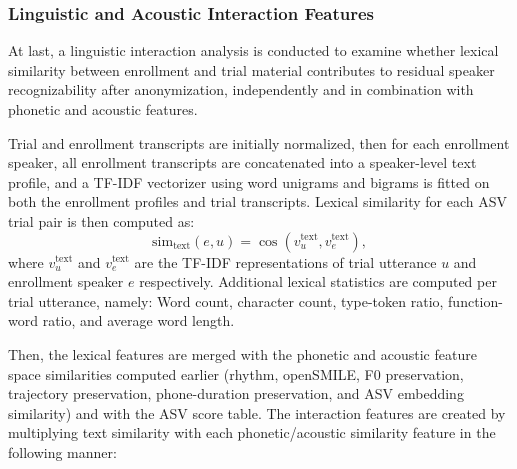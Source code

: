 \documentclass[12pt,leqno,a4paper]{article}
\begin{document}

\subsubsection{Linguistic and Acoustic Interaction Features}
\label{subsec:linguistic_acoustic_interaction}

At last, a linguistic interaction analysis is conducted to examine whether lexical similarity between enrollment and trial material 
contributes to residual speaker recognizability after anonymization, independently and in combination with phonetic and acoustic features.

Trial and enrollment transcripts are initially normalized, then for each enrollment speaker, all enrollment transcripts are concatenated into a speaker-level text profile, and a TF-IDF vectorizer using word unigrams and bigrams is fitted on both the enrollment profiles and trial transcripts. 
Lexical similarity for each ASV trial pair is then computed as:
\begin{equation}
\mathrm{sim}_{\mathrm{text}}(e,u) =
\cos(v_u^{\mathrm{text}}, v_e^{\mathrm{text}}),
\end{equation}
where $v_u^{\mathrm{text}}$ and $v_e^{\mathrm{text}}$ are the TF-IDF representations of trial utterance $u$ and enrollment speaker $e$ respectively. Additional lexical statistics are computed per trial utterance, namely: Word count, character count, type-token ratio, function-word ratio, and average word length.

Then, the lexical features are merged with the phonetic and acoustic feature space similarities computed earlier (rhythm, openSMILE, F0 preservation, trajectory preservation, phone-duration preservation, and ASV embedding similarity) and with the ASV score table. The interaction features are created by multiplying text similarity with each phonetic/acoustic similarity feature in the following manner:
\end{document}
